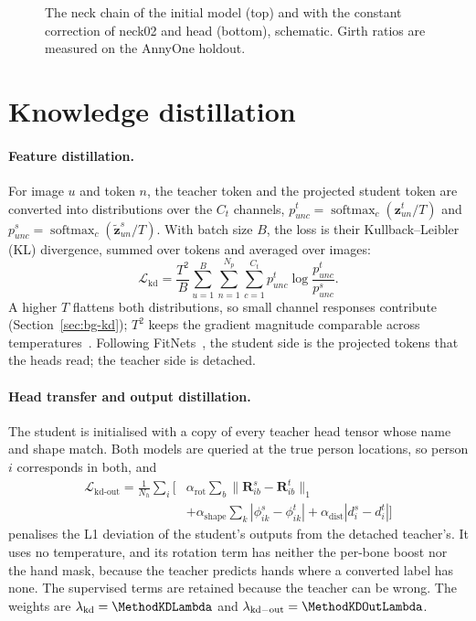 \begin{figure}[!htb]
  \centering
  
  \caption[The neck chain and its correction]{The neck chain of the initial model (top) and with the constant
  correction of neck02 and head (bottom), schematic. Girth ratios are measured on the AnnyOne holdout.}
  \label{fig:neck-chain}
\end{figure}

\section{Knowledge distillation}
\label{sec:method-kd}

\paragraph{Feature distillation.} For image $u$ and token $n$, the teacher token and the projected student token are
converted into distributions over the $C_t$ channels, $p^t_{unc}=\operatorname{softmax}_c(\mathbf z^t_{un}/T)$ and
$p^s_{unc}=\operatorname{softmax}_c(\widetilde{\mathbf z}^s_{un}/T)$. With batch size $B$, the loss is their
Kullback--Leibler (KL) divergence, summed over tokens and averaged over images:
\begin{equation}
 \mathcal L_{\mathrm{kd}}=
 \frac{T^2}{B}\sum_{u=1}^{B}\sum_{n=1}^{N_p}\sum_{c=1}^{C_t}
 p^t_{unc}\log\frac{p^t_{unc}}{p^s_{unc}} .
\label{eq:method-kd}
\end{equation}
A higher $T$ flattens both distributions, so small channel responses contribute (Section~\ref{sec:bg-kd}); $T^2$ keeps
the gradient magnitude comparable across temperatures~\cite{hinton2015distilling}. Following FitNets~\cite{romero2015fitnets}, the student side is the projected
tokens that the heads read; the teacher side is detached.

\paragraph{Head transfer and output distillation.} The student is initialised with a copy of every teacher head tensor
whose name and shape match. Both models are queried at the true person locations, so person $i$ corresponds in both,
and
\begin{equation}
\begin{split}
 \mathcal{L}_{\text{kd-out}}=\frac{1}{N_h}\sum_i\Big[
 &\alpha_{\text{rot}}\sum_b\|\mathbf R^s_{ib}-\mathbf R^t_{ib}\|_1\\
 &+\alpha_{\text{shape}}\sum_k|\phi^s_{ik}-\phi^t_{ik}|
 +\alpha_{\text{dist}}|d^s_i-d^t_i|\Big]
\end{split}
\label{eq:method-kdout}
\end{equation}
penalises the L1 deviation of the student's outputs from the detached teacher's. It uses no temperature, and its
rotation term has neither the per-bone boost nor the hand mask, because the teacher predicts hands where a converted
label has none. The supervised terms are retained because the teacher can be wrong. The weights are
$\lambda_{\mathrm{kd}}=\MethodKDLambda$ and $\lambda_{\mathrm{kd-out}}=\MethodKDOutLambda$.


